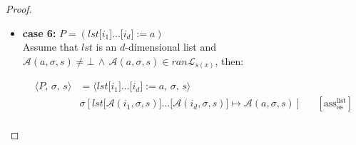\documentclass{article}
\begin{document}
\begin{proof}
\begin{itemize}
    Assume that $x$ is of a basic type and $\mathcal{A}(a, \sigma, s) \neq \bot \,\land\, \mathcal{A}(a, \sigma, s) \in ran\mathcal{L}_{s(x)}$, then:

    \[
      \begin{aligned}
      \langle P,\, \sigma,\, s \rangle
      &=\langle x \;\texttt{:=}\; a,\, \sigma,\, s \rangle \\
      &\sigma[x \mapsto \mathcal{A}(a, \sigma, s)]
      && [ \text{ass}_{\text{os}} ] \\   
      \end{aligned}
  \]
  
  then

  \[
      \begin{aligned}
      \langle \mathcal{C}(P),\, e,\, \sigma,\, s,\, pc \rangle
      &= \langle \mathcal{C}(x \;\texttt{:=}\; a),\, e,\, \sigma,\, s,\, pc \rangle \\
      &= \langle \mathcal{CA}(a) : \texttt{STORE}\;x ,\, e,\, \sigma,\, s,\, pc \rangle
      && \text{(definition of $\mathcal{C}$)} \\   
      &\triangleright^\ast \langle \texttt{STORE}\;x ,\, \mathcal{A}(a, \sigma, s) : e,\, \sigma,\, s,\, pc + l_a \rangle
      && \text{(correctness of $\mathcal{CA}$)} \\ 
      &= \langle \epsilon ,\,  e,\, \sigma[x \mapsto \mathcal{A}(a, \sigma, s)],\, s,\, pc + l_a + 1 \rangle
      && \text{(operational semantics)} \\ 
      \end{aligned}
  \]
  \item \textbf{case 6:} $P = (lst\texttt{[$i_1$]}\dots\texttt{[$i_d$]} \;\texttt{:=}\; a)$\\

    Assume that $lst$ is an $d$-dimensional list and $\mathcal{A}(a, \sigma, s) \neq \bot \,\land\, \mathcal{A}(a, \sigma, s) \in ran\mathcal{L}_{s(x)}$, then:

    \[
      \begin{aligned}
      \langle P,\, \sigma,\, s \rangle
      &=\langle lst\texttt{[$i_1$]}\dots\texttt{[$i_d$]} \;\texttt{:=}\; a,\, \sigma,\, s \rangle \\
      &\sigma[lst\texttt{[$\mathcal{A}(i_1, \sigma, s)$]}\dots\texttt{[$\mathcal{A}(i_d, \sigma, s)$]} \mapsto \mathcal{A}(a, \sigma, s)]
      && [ \text{ass}^{\text{list}}_{\text{os}} ] \\   
      \end{aligned}
  \]
  

\end{itemize}
\end{proof}
\end{document}

